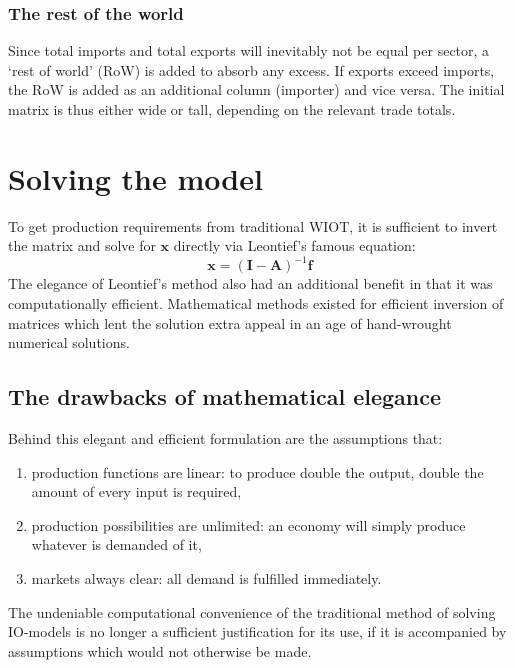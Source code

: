 \documentclass[a4paper]{article}
\begin{document}
\subsubsection*{The rest of the world}
Since total imports and total exports will inevitably not be equal per sector, a `rest of world' (RoW) is added to absorb any excess.
If exports exceed imports, the RoW is added as an additional column (importer) and vice versa.
The initial matrix is thus either wide or tall, depending on the relevant trade totals.

\section{Solving the model}\label{sec:algorithm}
To get production requirements from traditional WIOT, it is sufficient to invert the matrix and solve for $\boldsymbol{x}$ directly via Leontief's famous equation:
\begin{equation}
\boldsymbol{x} = (\boldsymbol{I}- \boldsymbol{A})^{-1}\boldsymbol{f}
\end{equation}
The elegance of Leontief's method also had an additional benefit in that it was computationally efficient.
Mathematical methods existed for efficient inversion of matrices which lent the solution extra appeal in an age of hand-wrought numerical solutions.

\subsection{The drawbacks of mathematical elegance}
Behind this elegant and efficient formulation are the assumptions that:
\begin{enumerate}[i]
\itemsep 0em
\item production functions are linear: to produce double the output, double the amount of every input is required,
\item production possibilities are unlimited: an economy will simply produce whatever is demanded of it,
\item markets always clear: all demand is fulfilled immediately.
\end{enumerate}
The undeniable computational convenience of the traditional method of solving IO-models is no longer a sufficient justification for its use, if it is accompanied by assumptions which would not otherwise be made.
\end{document}
